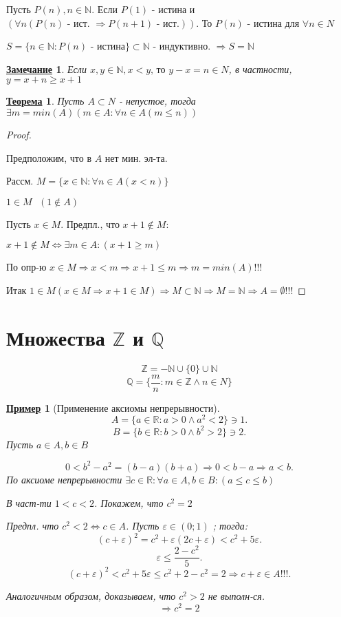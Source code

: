 \documentclass[12pt]{article}
\newcommand{\R}{\mathbb{R}}
\newcommand{\Q}{\mathbb{Q}}
\newcommand{\Z}{\mathbb{Z}}
\newcommand{\N}{\mathbb{N}}
\newtheorem{theorem}{\underline{Теорема}}[section]
\newtheorem*{note}{\underline{Замечание}}
\newtheorem*{example}{\underline{Пример}}
\theoremstyle{definition}
\theoremstyle{definition}
\begin{document}
Пусть $P(n), n  \in \N$. Если $P(1) $ - истина и $(\forall n (P(n) \text{ - ист. }  \Rightarrow P(n + 1) \text{ - ист.}))$. То $P(n)$ - истина для $\forall n  \in N$

$S = \{n  \in \N \colon P(n) \text{ - истина}\} \subset \N $ - индуктивно. $\Rightarrow S = \N$ 

\begin{note}
Если $x, y  \in \N, x < y \text{, то } y - x = n  \in N$, в частности, $y = x + n \geq x + 1$
\end{note}
\begin{theorem}
Пусть $A \subset N$ - непустое, тогда $\exists m = min(A) (m \in A \colon \forall n  \in A (m \leq n))$
\end{theorem}
\begin{proof} 
~\newline

Предположим, что в $A$ нет мин. эл-та. 

Рассм. $M = \{x  \in \N \colon \forall  n  \in A (x < n)\}$

$1  \in M \text{ }(1  \not \in A)$ 

Пусть $x  \in M$. Предпл., что $x + 1  \not \in M$:

$x + 1  \not \in M \iff \exists m \in A \colon  (x + 1 \geq m)$

По опр-ю $x \in M \Rightarrow x < m \Rightarrow x + 1 \leq m \Rightarrow m = min(A) !!!$

Итак $1 \in M (x  \in M \Rightarrow x + 1  \in  M) \Rightarrow M \subset \N \Rightarrow M = \N \Rightarrow A = \emptyset !!!$
\end{proof}

\section{Множества  $\Z$ и $\Q$}
\[
    \Z = -\N \cup \{0\} \cup \N
\]
\[
    \Q = \{\frac{m}{n} \colon m \in \Z \land n \in N\}
\]

\begin{example}[Применение аксиомы непрерывности]
\[
A = \{a \in \R \colon  a > 0 \land a^{2} < 2\} \ni 1
.\] 
\[
B = \{b \in \R \colon  b > 0 \land b^{2} > 2\} \ni 2
.\] 
Пусть $a \in A, b \in B$

\[
0 < b^{2} - a^{2} = (b - a)(b + a) \Rightarrow 0 < b - a \Rightarrow a < b
.\] 
По аксиоме непрерывности $\exists c \in \R \colon \forall  a \in A, b \in B \colon (a \leq c \leq b)$

В част-ти $1 < c < 2$. Покажем, что  $c^{2} = 2$

Предпл. что $c^{2} < 2 \iff c \in A$. Пусть $\varepsilon \in (0;1)$ ; тогда:
\[
    (c + \varepsilon)^{2} = c^{2} + \varepsilon(2c + \varepsilon) < c^{2} + 5\varepsilon
.\] 
\[
    \varepsilon \leq \frac{2 - c^{2}}{5} 
.\] 
\[
    (c + \varepsilon)^{2} < c^{2} + 5\varepsilon \leq c^{2} + 2 - c^{2} = 2 \Rightarrow c + \varepsilon \in A!!!
.\] 

Аналогичным образом, доказываем, что $c^{2} > 2$ не выполн-ся.
\[
    \Rightarrow c^{2} = 2
\]
\end{example}
\end{document}
